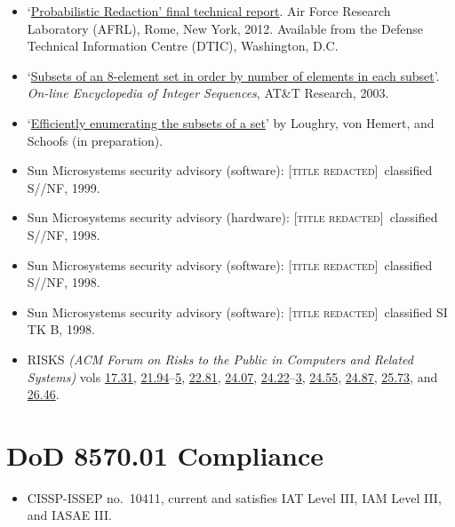 \documentclass[letterpaper]{article}
\newcommand{\redacted}{\textsc{[title redacted]}}
\begin{document}
\begin{itemize}
	\item `\href{http://applied-math.org/Loughry2011.pdf}{Probabilistic Redaction' final
		technical report}. Air Force Research Laboratory (AFRL), Rome, New York, 2012.
		Available from the Defense Technical Information Centre (DTIC), Washington, D.C.

	\item `\href{http://oeis.org/A047869}{Subsets of an 8-element set in order by number
		of elements in each subset}'. \emph{On-line Encyclopedia of Integer Sequences},
		AT\&T Research, 2003.

	\item `\href{http://www.applied-math.org/subset.pdf}{Efficiently enumerating the
		subsets of a set}' by Loughry, von Hemert, and Schoofs (in preparation).

    \item Sun Microsystems security advisory (software): \redacted\ classified S//NF, 1999.
	\item Sun Microsystems security advisory (hardware): \redacted\ classified S//NF, 1998.
	\item Sun Microsystems security advisory (software): \redacted\ classified S//NF, 1998.
	\item Sun Microsystems security advisory (software): \redacted\ classified SI TK B, 1998.

    \item RISKS \emph{(ACM Forum on Risks to the Public in Computers
    and Related Systems)} vols \href{http://catless.ncl.ac.uk/Risks/17.31.html}{17.31},
	\href{http://catless.ncl.ac.uk/Risks/21.94.html}{21.94}--\href{http://catless.ncl.ac.uk/Risks/21.95.html}{5},
	\href{http://catless.ncl.ac.uk/Risks/21.81.html}{22.81},
	\href{http://catless.ncl.ac.uk/Risks/24.07.html}{24.07},
    \href{http://catless.ncl.ac.uk/Risks/24.22.html}{24.22}--\href{http://catless.ncl.ac.uk/Risks/24.23.html}{3},
	\href{http://catless.ncl.ac.uk/Risks/24.55.html}{24.55},
	\href{http://catless.ncl.ac.uk/Risks/24.87.html}{24.87},
	\href{http://catless.ncl.ac.uk/Risks/25.73.html}{25.73},
	and \href{http://catless.ncl.ac.uk/Risks/26.46.html}{26.46}.
\end{itemize}

\section*{DoD 8570.01 Compliance}

\begin{itemize}
	\item CISSP-ISSEP no.\ 10411, current and satisfies IAT Level III, IAM Level III,
		and IASAE III.
\end{itemize}
\end{document}
